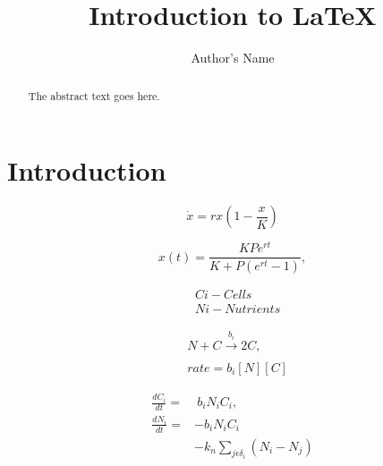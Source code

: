 \documentclass{article}
\begin{document}
\title{Introduction to \LaTeX{}}
\author{Author's Name}

\maketitle

\begin{abstract}
The abstract text goes here.
\end{abstract}

\section{Introduction}


\begin{equation}
\label{eq:1}
\dot{x} = rx\left(1 - \frac{x}{K}\right)
\end{equation}

\begin{equation}
\label{eq:2}
x(t) = \frac{KPe^{rt}}{K + P(e^{rt}-1)},
\end{equation}

\begin{subequations}
	\begin{align}
	&C{i} - Cells\\
	&N{i} - Nutrients
	\end{align}
\end{subequations}

\begin{subequations}
	\label{eq:9}
	\begin{align}
		&N + C \xrightarrow[]{b_{i}} 2C,\\
		&rate = b_{i}[N][C]
	\end{align}
\end{subequations}

\begin{subequations}
	\label{eq:5}
	\begin{align}
	\frac{dC_{i}}{dt} =&~b_{i}N_{i}C_{i},\\
	\frac{dN_{i}}{dt} =& - b_{i}N_{i}C_{i}\\
	 & - k_{n}\sum_{j \epsilon \delta_i}(N_{i} - N_{j})\\
	\end{align}
\end{subequations}
\end{document}
